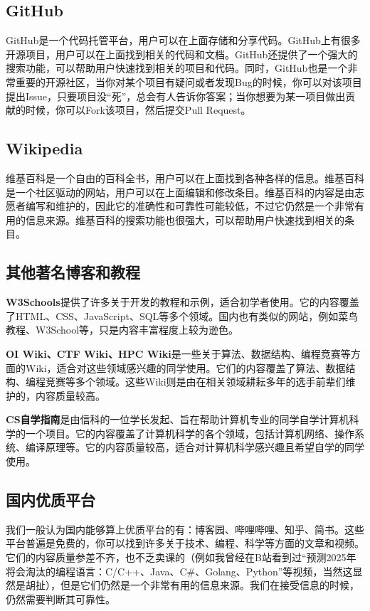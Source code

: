 \documentclass[12pt]{report}
\begin{document}
\subsection{GitHub}

GitHub是一个代码托管平台，用户可以在上面存储和分享代码。GitHub上有很多开源项目，用户可以在上面找到相关的代码和文档。GitHub还提供了一个强大的搜索功能，可以帮助用户快速找到相关的项目和代码。同时，GitHub也是一个非常重要的开源社区，当你对某个项目有疑问或者发现Bug的时候，你可以对该项目提出Issue，只要项目没“死”，总会有人告诉你答案；当你想要为某一项目做出贡献的时候，你可以Fork该项目，然后提交Pull Request。

\subsection{Wikipedia}

维基百科是一个自由的百科全书，用户可以在上面找到各种各样的信息。维基百科是一个社区驱动的网站，用户可以在上面编辑和修改条目。维基百科的内容是由志愿者编写和维护的，因此它的准确性和可靠性可能较低，不过它仍然是一个非常有用的信息来源。维基百科的搜索功能也很强大，可以帮助用户快速找到相关的条目。

\subsection{其他著名博客和教程}

\textbf{W3Schools}提供了许多关于开发的教程和示例，适合初学者使用。它的内容覆盖了HTML、CSS、JavaScript、SQL等多个领域。国内也有类似的网站，例如菜鸟教程、W3School等，只是内容丰富程度上较为逊色。

\textbf{OI Wiki、CTF Wiki、HPC Wiki}是一些关于算法、数据结构、编程竞赛等方面的Wiki，适合对这些领域感兴趣的同学使用。它们的内容覆盖了算法、数据结构、编程竞赛等多个领域。这些Wiki则是由在相关领域耕耘多年的选手前辈们维护的，内容质量较高。

\textbf{CS自学指南}是由信科的一位学长发起、旨在帮助计算机专业的同学自学计算机科学的一个项目。它的内容覆盖了计算机科学的各个领域，包括计算机网络、操作系统、编译原理等。它的内容质量较高，适合对计算机科学感兴趣且希望自学的同学使用。

\subsection{国内优质平台}

我们一般认为国内能够算上优质平台的有：博客园、哔哩哔哩、知乎、简书。这些平台普遍是免费的，你可以找到许多关于技术、编程、科学等方面的文章和视频。它们的内容质量参差不齐，也不乏卖课的（例如我曾经在B站看到过“预测2025年将会淘汰的编程语言：C/C++、Java、C\#、Golang、Python”等视频，当然这显然是胡扯），但是它们仍然是一个非常有用的信息来源。我们在接受信息的时候，仍然需要判断其可靠性。
\end{document}
